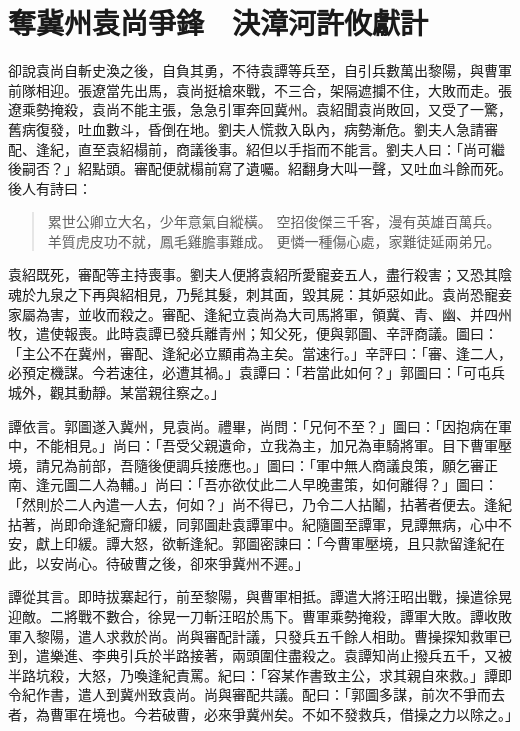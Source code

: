 
\chapter{奪冀州袁尚爭鋒　決漳河許攸獻計}

卻說袁尚自斬史渙之後，自負其勇，不待袁譚等兵至，自引兵數萬出黎陽，與曹軍前隊相迎。張遼當先出馬，袁尚挺槍來戰，不三合，架隔遮攔不住，大敗而走。張遼乘勢掩殺，袁尚不能主張，急急引軍奔回冀州。袁紹聞袁尚敗回，又受了一驚，舊病復發，吐血數斗，昏倒在地。劉夫人慌救入臥內，病勢漸危。劉夫人急請審配、逢紀，直至袁紹榻前，商議後事。紹但以手指而不能言。劉夫人曰：「尚可繼後嗣否？」紹點頭。審配便就榻前寫了遺囑。紹翻身大叫一聲，又吐血斗餘而死。後人有詩曰：

\begin{quote}
累世公卿立大名，少年意氣自縱橫。
空招俊傑三千客，漫有英雄百萬兵。
羊質虎皮功不就，鳳毛雞膽事難成。
更憐一種傷心處，家難徒延兩弟兄。
\end{quote}

袁紹既死，審配等主持喪事。劉夫人便將袁紹所愛寵妾五人，盡行殺害；又恐其陰魂於九泉之下再與紹相見，乃髡其髮，刺其面，毀其屍：其妒惡如此。袁尚恐寵妾家屬為害，並收而殺之。審配、逢紀立袁尚為大司馬將軍，領冀、青、幽、并四州牧，遣使報喪。此時袁譚已發兵離青州；知父死，便與郭圖、辛評商議。圖曰：「主公不在冀州，審配、逢紀必立顯甫為主矣。當速行。」辛評曰：「審、逢二人，必預定機謀。今若速往，必遭其禍。」袁譚曰：「若當此如何？」郭圖曰：「可屯兵城外，觀其動靜。某當親往察之。」

譚依言。郭圖遂入冀州，見袁尚。禮畢，尚問：「兄何不至？」圖曰：「因抱病在軍中，不能相見。」尚曰：「吾受父親遺命，立我為主，加兄為車騎將軍。目下曹軍壓境，請兄為前部，吾隨後便調兵接應也。」圖曰：「軍中無人商議良策，願乞審正南、逢元圖二人為輔。」尚曰：「吾亦欲仗此二人早晚畫策，如何離得？」圖曰：「然則於二人內遣一人去，何如？」尚不得已，乃令二人拈鬮，拈著者便去。逢紀拈著，尚即命逢紀齎印緩，同郭圖赴袁譚軍中。紀隨圖至譚軍，見譚無病，心中不安，獻上印緩。譚大怒，欲斬逢紀。郭圖密諫曰：「今曹軍壓境，且只款留逢紀在此，以安尚心。待破曹之後，卻來爭冀州不遲。」

譚從其言。即時拔寨起行，前至黎陽，與曹軍相抵。譚遣大將汪昭出戰，操遣徐晃迎敵。二將戰不數合，徐晃一刀斬汪昭於馬下。曹軍乘勢掩殺，譚軍大敗。譚收敗軍入黎陽，遣人求救於尚。尚與審配計議，只發兵五千餘人相助。曹操探知救軍已到，遣樂進、李典引兵於半路接著，兩頭圍住盡殺之。袁譚知尚止撥兵五千，又被半路坑殺，大怒，乃喚逢紀責罵。紀曰：「容某作書致主公，求其親自來救。」譚即令紀作書，遣人到冀州致袁尚。尚與審配共議。配曰：「郭圖多謀，前次不爭而去者，為曹軍在境也。今若破曹，必來爭冀州矣。不如不發救兵，借操之力以除之。」

